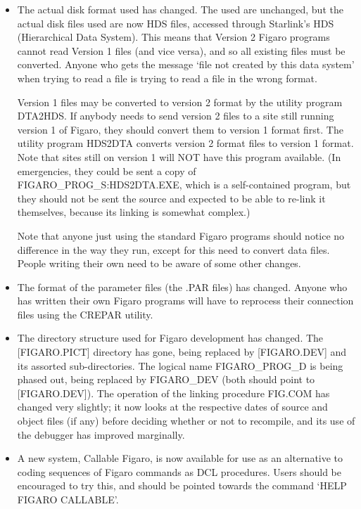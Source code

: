 \begin{itemize}
\item The actual disk format used has changed. The used are unchanged, but the
actual disk files used are now HDS files, accessed through Starlink's HDS
(Hierarchical Data System). This means that Version 2 Figaro programs cannot
read Version 1 files (and vice versa), and so all existing files must be
converted. Anyone who gets the message `file not created by this data system'
when trying to read a file is trying to read a file in the wrong format.

Version 1 files may be converted to version 2 format by the utility program
DTA2HDS. If anybody needs to send version 2 files to a site still running 
version 1 of Figaro, they should convert them to version 1 format first. The
utility program HDS2DTA converts version 2 format files to version 1 format.
Note that sites still on version 1 will NOT have this program available. (In
emergencies, they could be sent a copy of FIGARO\_PROG\_S:HDS2DTA.EXE, which is
a self-contained program, but they should not be sent the source and expected
to be able to re-link it themselves, because its linking is somewhat complex.)

Note that anyone just using the standard Figaro programs should notice no
difference in the way they run, except for this need to convert data files. 
People writing their own need to be aware of some other changes.

\item The format of the parameter files (the .PAR files) has changed. Anyone
who has written their own Figaro programs will have to reprocess their
connection files using the CREPAR utility.

\item The directory structure used for Figaro development has changed. The
[FIGARO.PICT] directory has gone, being replaced by [FIGARO.DEV] and its
assorted sub-directories. The logical name FIGARO\_PROG\_D is being phased out,
being replaced by FIGARO\_DEV (both should point to [FIGARO.DEV]). The operation
of the linking procedure FIG.COM has changed very slightly; it now looks at the
respective dates of source and object files (if any) before deciding whether or
not to recompile, and its use of the debugger has improved marginally.

\item A new system, Callable Figaro, is now available for use as an alternative 
to coding sequences of Figaro commands as DCL procedures. Users should be 
encouraged to try this, and should be pointed towards the command `HELP FIGARO
CALLABLE'.

\end{itemize}

